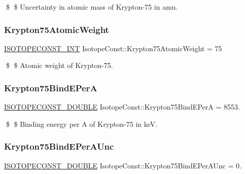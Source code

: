 \$ \$ Uncertainty in atomic mass of Krypton-\/75 in amu. \mbox{\label{group___isotope_const-_krypton-_kr75_ga8cf9d2189309d30b111969f8f804bf56}} 
\subsubsection{\texorpdfstring{Krypton75\+Atomic\+Weight}{Krypton75AtomicWeight}}
{\footnotesize\ttfamily \mbox{\hyperlink{group___isotope_const-_macros_ga5f18360b3e99483a35c32d789e62621c}{I\+S\+O\+T\+O\+P\+E\+C\+O\+N\+S\+T\+\_\+\+I\+NT}} Isotope\+Const\+::\+Krypton75\+Atomic\+Weight = 75}

\$ \$ Atomic weight of Krypton-\/75. \mbox{\label{group___isotope_const-_krypton-_kr75_gab71bac619bea345bd518b203c610b5cd}} 
\subsubsection{\texorpdfstring{Krypton75\+Bind\+E\+PerA}{Krypton75BindEPerA}}
{\footnotesize\ttfamily \mbox{\hyperlink{group___isotope_const-_macros_ga8f45a7272ce02c0b4c65c44636ed719a}{I\+S\+O\+T\+O\+P\+E\+C\+O\+N\+S\+T\+\_\+\+D\+O\+U\+B\+LE}} Isotope\+Const\+::\+Krypton75\+Bind\+E\+PerA = 8553.}

\$ \$ Binding energy per A of Krypton-\/75 in keV. \mbox{\label{group___isotope_const-_krypton-_kr75_gab11d77c92c1e170cd0a97ff25644e81f}} 
\subsubsection{\texorpdfstring{Krypton75\+Bind\+E\+Per\+A\+Unc}{Krypton75BindEPerAUnc}}
{\footnotesize\ttfamily \mbox{\hyperlink{group___isotope_const-_macros_ga8f45a7272ce02c0b4c65c44636ed719a}{I\+S\+O\+T\+O\+P\+E\+C\+O\+N\+S\+T\+\_\+\+D\+O\+U\+B\+LE}} Isotope\+Const\+::\+Krypton75\+Bind\+E\+Per\+A\+Unc = 0.}


